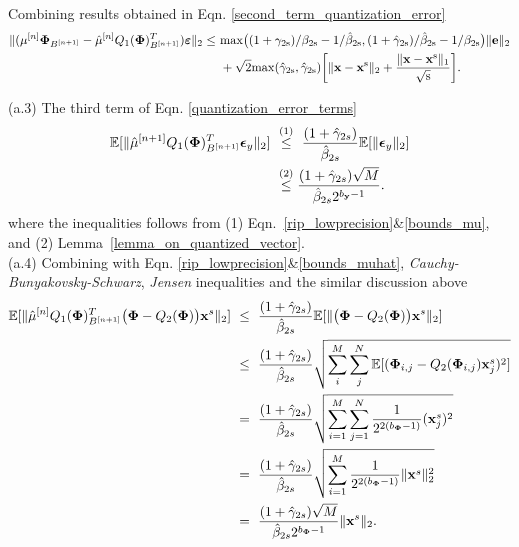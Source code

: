 \documentclass{article}
\begin{document}
Combining results obtained in Eqn. \ref{second_term_quantization_error} 
\begin{equation}\label{second_term_main_theorem}
\begin{split}
    \|(\mu^{[n]}{\bf \Phi}_{B^{[n+1]}} - \hat{\mu}^{[n]}Q_1({\bf \Phi})_{B^{[n+1]}}^T)\boldsymbol{\bf \varepsilon} \|_2 \leq & \ \rm{max}\big((1+\gamma_{2s})/\beta_{2s} - 1/\hat{\beta}_{2s}, (1+\hat{\gamma}_{2s})/\hat{\beta}_{2s} - 1/{\beta}_{2s} \big)\|{\bf e} \|_2\\
    & \ + \sqrt{2}\rm{max}(\hat{\gamma}_{2s}, \hat{\gamma}_{2s})\bigg  [ \|{\bf x}-{\bf x}^s \|_2 + \frac{\|{\bf x}-{\bf x}^s \|_1}{\sqrt{s}}\bigg].
\end{split}
\end{equation}

(a.3) The third term of Eqn. \ref{quantization_error_terms}
\begin{equation}\label{third_term_main_theorem}
    \begin{split}
         \mathbb{E}[\|\hat{\mu}^{[n+1]}Q_1({\bf \Phi})_{B^{[n+1]}}^T \boldsymbol{\epsilon}_y \|_2]& \ \stackrel{(1)}{\leq} \  \frac{(1+\hat{\gamma}_{2s})}{\hat{\beta}_{2s}}\mathbb{E}[{\|\boldsymbol{\epsilon}_y \|_2}]\\
         &\ \stackrel{(2)}{\leq}\frac{(1+\hat{\gamma}_{2s})\sqrt{M}}{\hat{\beta}_{2s}2^{b_{\bf y}-1}}.
    \end{split}
\end{equation}
where the inequalities follows from (1) Eqn.~\ref{rip_lowprecision}\&\ref{bounds_mu}, and (2) Lemma~\ref{lemma_on_quantized_vector}.\\

(a.4) Combining with Eqn. \ref{rip_lowprecision}\&\ref{bounds_muhat}, {\it Cauchy-Bunyakovsky-Schwarz}, {\it Jensen} inequalities and the similar discussion above
\begin{equation}\label{forth_term_main_theorem}
\begin{split}
    \mathbb{E}[\| \hat{\mu}^{[n]}Q_1({\bf \Phi})_{B^{[n+1]}}^T\big({\bf {\bf \Phi}}-Q_2({\bf {\bf \Phi}})\big){\bf x}^s \|_2]&\ \leq \ \frac{(1+\hat{\gamma}_{2s})}{\hat{\beta}_{2s}}\mathbb{E}[\|\big({\bf {\bf \Phi}}-Q_2({\bf {\bf \Phi}})\big){\bf x}^s \|_2]\\
    &\ \leq \ \frac{(1+\hat{\gamma}_{2s})}{\hat{\beta}_{2s}}\sqrt{
    \sum_{i}^M \sum_{j}^N\mathbb{E}[({\bf \Phi}_{i, j}-Q_2({\bf \Phi}_{i, j}){\bf x}_j^s)^2]}\\
    & \ = \ \frac{(1+\hat{\gamma}_{2s})}{\hat{\beta}_{2s}}\sqrt{\sum_{i=1}^M \sum_{j=1}^N \frac{1}{2^{2(b_{\bf \Phi}-1)}}({\bf x}_j^s)^2}\\
    & \ = \ \frac{(1+\hat{\gamma}_{2s})}{\hat{\beta}_{2s}}\sqrt{\sum_{i=1}^M \frac{1}{2^{2(b_{\bf \Phi}-1)}}\|{\bf x}^s\|_2^2}\\
    & \ = \ \frac{(1+\hat{\gamma}_{2s})\sqrt{M}}{\hat{\beta}_{2s}2^{b_{\bf \Phi}-1}}\|{\bf x}^s \|_2.
\end{split}
\end{equation}
\end{document}
